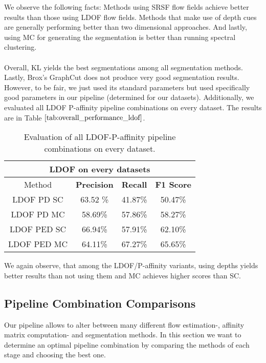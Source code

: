We observe the following facts: Methods using SRSF flow fields achieve better results than those using LDOF flow fields. Methods that make use of depth cues are generally performing better than two dimensional approaches. And lastly, using MC for generating the segmentation is better than running spectral clustering. \\ \\
Overall, KL yields the best segmentations among all segmentation methods. Lastly, Brox's GraphCut does not produce very good segmentation results. However, to be fair, we just used its standard parameters but used specifically good parameters in our pipeline (determined for our datasets).
Additionally, we evaluated all LDOF P-affinity pipeline combinations on every dataset. The results are in Table $\ref{tab:overall_performance_ldof}$.
\begin{table}[H]
\centering
\begin{tabular}{|c|c|c|c|}
\hline
\multicolumn{4}{|c|}{LDOF on every datasets}                        \\ \hline
Method & \textbf{Precision} & \textbf{Recall} & \textbf{F1 Score} \\ \hline
LDOF PD SC & 63.52 \%   & 41.87\%     & 50.47\%  \\ \hline
LDOF PD MC & 58.69\%   & 57.86\%     & 58.27\%  \\ \hline
LDOF PED SC & 66.94\%   & 57.91\%     & 62.10\%  \\ \hline
LDOF PED MC & 64.11\%   & 67.27\%     & 65.65\%  \\ \hline                 
\end{tabular}
\caption[Overall Performance LDOF P-Affinities]{Evaluation of all LDOF-P-affinity pipeline combinations on every dataset. }
\label{tab:overall_performance_ldof}
\end{table}
We again observe, that among the LDOF/P-affinity variants, using depths yields better results than not using them and MC achieves higher scores than SC.  

\subsection{Pipeline Combination Comparisons}
\label{sec:pipeline_combination_cmp}
Our pipeline allows to alter between many different flow estimation-, affinity matrix computation- and segmentation methods. In this section we want to determine an optimal pipeline combination by comparing the methods of each stage and choosing the best one.


